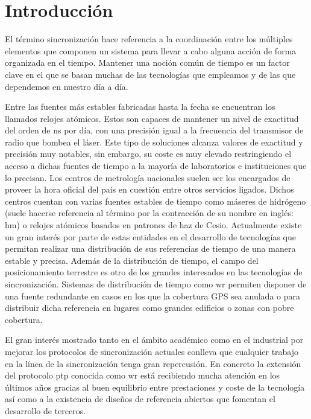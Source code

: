 \chapter{Introducción}

El término sincronización hace referencia a la coordinación entre los múltiples 
elementos que componen un sistema para llevar a cabo alguna acción de forma 
organizada en el tiempo. Mantener una noción común de tiempo es un factor clave 
en el que se basan muchas de las tecnologías que empleamos y de las que 
dependemos en nuestro día a día.

Entre las 
fuentes más estables fabricadas hasta la fecha se encuentran los llamados 
relojes
atómicos. Estos son capaces de mantener un nivel de exactitud del 
orden de \gls{ns} por día, con una precisión igual a la frecuencia del
transmisor de radio que bombea el láser. Este tipo de 
soluciones alcanza valores de exactitud y precisión muy notables, sin embargo, 
su coste es muy elevado restringiendo el acceso a dichas fuentes de tiempo a la 
mayoría de laboratorios e instituciones que lo precisan. Los centros de 
metrología nacionales suelen ser los encargados de proveer la hora oficial del 
país en cuestión entre otros servicios ligados. Dichos centros cuentan con 
varias fuentes estables de tiempo como máseres de hidrógeno (suele
hacerse referencia al término por la contracción de su nombre en inglés: 
\acrshort{hm}) o relojes atómicos basados en patrones de haz de Cesio. 
Actualmente existe un gran interés por parte de estas entidades en el 
desarrollo de tecnologías que permitan realizar una distribución de sus 
referencias de tiempo de una manera estable y precisa.
Además de la distribución de tiempo, el campo del posicionamiento terrestre es 
otro de los grandes interesados en las tecnologías de sincronización. Sistemas 
de distribución de tiempo como \gls{wr} permiten disponer de una fuente 
redundante 
en casos en los que la cobertura GPS sea anulada o para distribuir dicha 
referencia en lugares como grandes edificios o zonas con pobre cobertura.

El gran interés mostrado tanto en el ámbito académico como en el industrial por 
mejorar los protocolos de sincronización actuales conlleva que cualquier 
trabajo en la línea de la sincronización tenga gran repercusión. En concreto la 
extensión del protocolo \gls{ptp} conocida como \gls{wr} está recibiendo mucha 
atención en los últimos años gracias al buen equilibrio entre prestaciones y 
coste de la tecnología así como a la existencia de diseños de referencia 
abiertos que fomentan el desarrollo de terceros.

